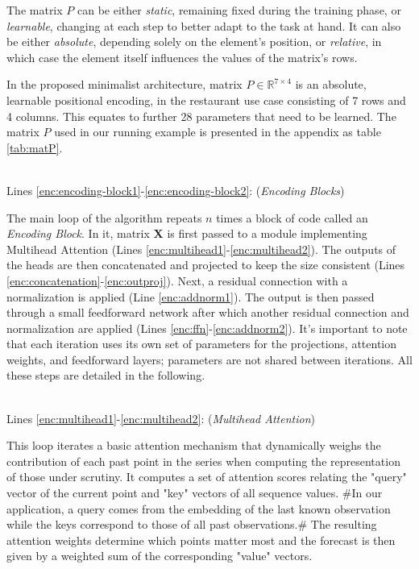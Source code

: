 \documentclass[algorithms,article,submit,pdftex,moreauthors]{Definitions/mdpi}
\begin{document}
The matrix $P$ can be either \textit{static}, remaining fixed during the training phase, or \textit{learnable}, changing at each step to better adapt to the task at hand. It can also be either \textit{absolute}, depending solely on the element's position, or \textit{relative}, in which case the element itself influences the values of the matrix's rows. 

In the proposed minimalist architecture, matrix $P \in \mathbb{R}^{7 \times 4}$ is an absolute, learnable positional encoding, in the restaurant use case consisting of 7 rows and 4 columns. This equates to further 28 parameters that need to be learned. The matrix $P$ used in our running example is presented in the appendix as table \ref{tab:matP}. 

~\\Lines \ref{enc:encoding-block1}-\ref{enc:encoding-block2}: (\textit{Encoding Blocks})

The main loop of the algorithm repeats $n$ times a block of code called an {\it Encoding Block}. In it, matrix {\bf X} is first passed to a module implementing Multihead Attention (Lines \ref{enc:multihead1}-\ref{enc:multihead2}). The outputs of the heads are then concatenated and projected to keep the size consistent (Lines \ref{enc:concatenation}-\ref{enc:outproj}). Next, a residual connection with a normalization is applied (Line \ref{enc:addnorm1}). The output is then passed through a small feedforward network after which another residual connection and normalization are applied (Lines \ref{enc:ffn}-\ref{enc:addnorm2}).
It's important to note that each iteration uses its own set of parameters for the projections, attention weights, and feedforward layers; parameters are not shared between iterations.
All these steps are detailed in the following.

~\\Lines \ref{enc:multihead1}-\ref{enc:multihead2}: (\textit{Multihead Attention})

This loop iterates a basic attention mechanism that dynamically weighs the contribution of each past point in the series when computing the representation of those under scrutiny. It computes a set of attention scores relating the "query" vector of the current point and "key" vectors of all sequence values. \#In our application, a query comes from the embedding of the last known observation while the keys correspond to those of all past observations.\# The resulting attention weights determine which points matter most and the forecast is then given by a weighted sum of the corresponding "value" vectors.
\end{document}
